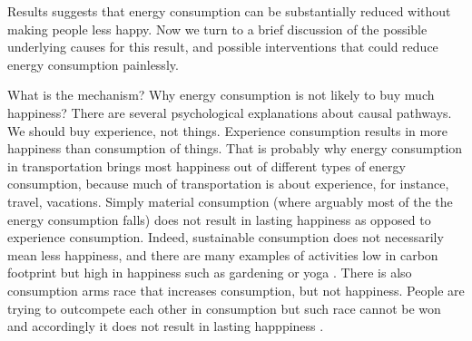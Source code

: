 \documentclass[10pt, letterpaper]{article}
\begin{document}
\begin{spacing}{1.4}
Results suggests that  energy consumption can be substantially reduced
without making people less happy.  Now we turn to a brief  discussion of the possible underlying causes for
this result, and  possible interventions that could reduce energy consumption
painlessly. 

What is the mechanism? Why energy consumption is not likely to buy much
happiness?  There are several psychological explanations about causal pathways.
We should buy experience, not things. Experience consumption results in more
happiness than consumption of things. 
That is  probably why  energy
consumption in transportation brings most happiness out of different types of
energy consumption, because much of
transportation is about experience, for instance, travel, vacations. 
Simply material consumption (where arguably most of the  the energy consumption
falls) does not result in lasting happiness as opposed to experience
consumption. Indeed, sustainable consumption does not necessarily mean less
happiness, and there are many examples of activities low in carbon footprint but
high in happiness such as gardening or yoga \cite{madjar06}. There is also
consumption arms race that increases consumption, but not happiness. People are trying to outcompete each other in
consumption but such race cannot be won and accordingly it does not result in lasting
happpiness \cite{frank12}.%



\end{spacing}
\end{document}
